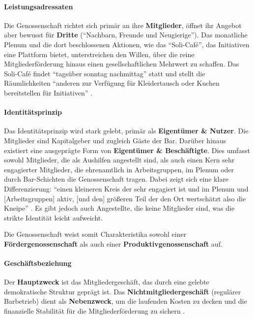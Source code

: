 \paragraph{Leistungsadressaten}
Die Genossenschaft richtet sich primär an ihre \textbf{Mitglieder}, öffnet ihr Angebot aber bewusst für \textbf{Dritte} (\enquote{Nachbarn, Freunde und Neugierige}). Das monatliche Plenum und die dort beschlossenen Aktionen, wie das \enquote{Soli-Café}, das Initiativen eine Plattform bietet, unterstreichen den Willen, über die reine Mitgliederförderung hinaus einen gesellschaftlichen Mehrwert zu schaffen. Das Soli-Café findet \enquote{tagsüber sonntag nachmittag} statt und stellt die Räumlichkeiten \enquote{anderen zur Verfügung für Kleidertausch oder Kuchen bereitstellen für Initiativen} \parencite{mederInterviewZurGeschaftsmodellanalyse2025}.

\paragraph{Identitätsprinzip}
Das Identitätsprinzip wird stark gelebt, primär als \textbf{Eigentümer \& Nutzer}. Die Mitglieder sind Kapitalgeber und zugleich Gäste der Bar. Darüber hinaus existiert eine ausgeprägte Form von \textbf{Eigentümer \& Beschäftigte}. Dies umfasst sowohl Mitglieder, die als Aushilfen angestellt sind, als auch einen Kern sehr engagierter Mitglieder, die ehrenamtlich in Arbeitsgruppen, im Plenum oder durch Bar-Schichten die Genossenschaft tragen. Dabei zeigt sich eine klare Differenzierung: \enquote{einen kleineren Kreis der sehr engagiert ist und im Plenum und [Arbeitsgruppen] aktiv, [und den] größeren Teil der den Ort wertschätzt also die Kneipe} \parencite{mederInterviewZurGeschaftsmodellanalyse2025}. Es gibt jedoch auch Angestellte, die keine Mitglieder sind, was die strikte Identität leicht aufweicht.

Die Genossenschaft weist somit Charakteristika sowohl einer \textbf{Fördergenossenschaft} als auch einer \textbf{Produktivgenossenschaft} auf.

\paragraph{Geschäftsbeziehung}
Der \textbf{Hauptzweck} ist das Mitgliedergeschäft, das durch eine gelebte demokratische Struktur geprägt ist. Das \textbf{Nichtmitgliedergeschäft} (regulärer Barbetrieb) dient als \textbf{Nebenzweck}, um die laufenden Kosten zu decken und die finanzielle Stabilität für die Mitgliederförderung zu sichern \parencite{SatzungTRINKGENOSSE2019}.

